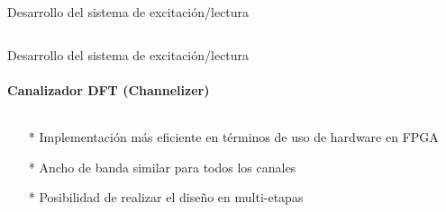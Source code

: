 \documentclass[ignorenonframetext,12pt]{beamer}
\begin{document}
\begin{frame}{Desarrollo del sistema de excitación/lectura}
\begin{columns}
\begin{column}{0.5\textwidth}
\begin{center}
												\end{center}
								\end{column}
				\end{columns}

\end{frame}


\begin{frame}{Desarrollo del sistema de excitación/lectura}
\framesubtitle{Canalizador DFT (Channelizer)}
				\begin{columns}
								\begin{column}{0.4\textwidth}
												\begin{itemize}
																\item[*] Implementación m\'as eficiente en t\'erminos de uso de hardware en FPGA
																\item[*] Ancho de banda similar para todos los canales 
																\item[*] Posibilidad de realizar el diseño en multi-etapas
												\end{itemize}
								\end{column}
								\begin{column}{0.6\textwidth}


\end{column}
\end{columns}
\end{frame}
\end{document}
